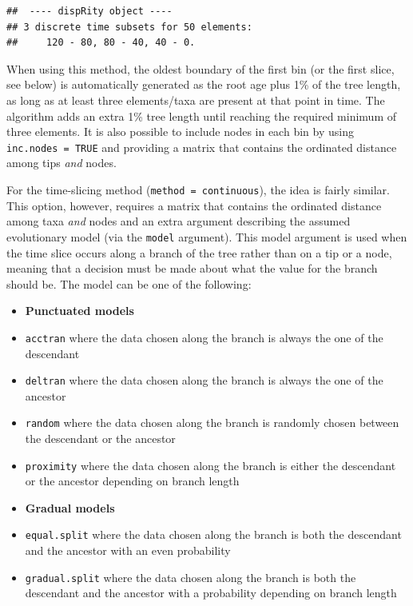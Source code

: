 \documentclass[]{book}
\theoremstyle{definition}
\theoremstyle{definition}
\theoremstyle{definition}
\theoremstyle{remark}
\begin{document}
\begin{verbatim}
##  ---- dispRity object ---- 
## 3 discrete time subsets for 50 elements:
##     120 - 80, 80 - 40, 40 - 0.
\end{verbatim}

When using this method, the oldest boundary of the first bin (or the
first slice, see below) is automatically generated as the root age plus
1\% of the tree length, as long as at least three elements/taxa are
present at that point in time. The algorithm adds an extra 1\% tree
length until reaching the required minimum of three elements. It is also
possible to include nodes in each bin by using
\texttt{inc.nodes\ =\ TRUE} and providing a matrix that contains the
ordinated distance among tips \emph{and} nodes.

For the time-slicing method (\texttt{method\ =\ continuous}), the idea
is fairly similar. This option, however, requires a matrix that contains
the ordinated distance among taxa \emph{and} nodes and an extra argument
describing the assumed evolutionary model (via the \texttt{model}
argument). This model argument is used when the time slice occurs along
a branch of the tree rather than on a tip or a node, meaning that a
decision must be made about what the value for the branch should be. The
model can be one of the following:

\begin{itemize}
\item
  \textbf{Punctuated models}
\item
  \texttt{acctran} where the data chosen along the branch is always the
  one of the descendant
\item
  \texttt{deltran} where the data chosen along the branch is always the
  one of the ancestor
\item
  \texttt{random} where the data chosen along the branch is randomly
  chosen between the descendant or the ancestor
\item
  \texttt{proximity} where the data chosen along the branch is either
  the descendant or the ancestor depending on branch length
\item
  \textbf{Gradual models}
\item
  \texttt{equal.split} where the data chosen along the branch is both
  the descendant and the ancestor with an even probability
\item
  \texttt{gradual.split} where the data chosen along the branch is both
  the descendant and the ancestor with a probability depending on branch
  length
\end{itemize}
\end{document}
